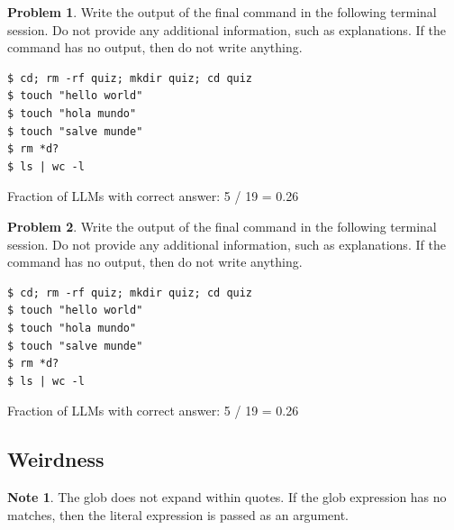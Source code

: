 \documentclass[10pt]{article}
\theoremstyle{definition}
\newtheorem{problem}{Problem}
\newtheorem{note}{Note}
\begin{document}
\noindent\vspace{0.1in}\begin{minipage}{\textwidth}

\begin{problem}
Write the output of the final command in the following terminal session.
Do not provide any additional information,
such as explanations.
If the command has no output,
then do not write anything.

\end{problem}
\begin{lstlisting}
$ cd; rm -rf quiz; mkdir quiz; cd quiz
$ touch "hello world"
$ touch "hola mundo"
$ touch "salve munde"
$ rm *d?
$ ls | wc -l
\end{lstlisting}

Fraction of LLMs with correct answer: 5 / 19 = 0.26
\end{minipage}
\noindent\vspace{0.1in}\begin{minipage}{\textwidth}

\begin{problem}
Write the output of the final command in the following terminal session.
Do not provide any additional information,
such as explanations.
If the command has no output,
then do not write anything.

\end{problem}
\begin{lstlisting}
$ cd; rm -rf quiz; mkdir quiz; cd quiz
$ touch "hello world"
$ touch "hola mundo"
$ touch "salve munde"
$ rm *d?
$ ls | wc -l
\end{lstlisting}

Fraction of LLMs with correct answer: 5 / 19 = 0.26
\end{minipage}
\noindent\vspace{0.1in}\begin{minipage}{\textwidth}
\subsection{Weirdness}

\begin{note}
The glob does not expand within quotes.
If the glob expression has no matches,
then the literal expression is passed as an argument.

\end{note}

\end{minipage}
\end{document}
